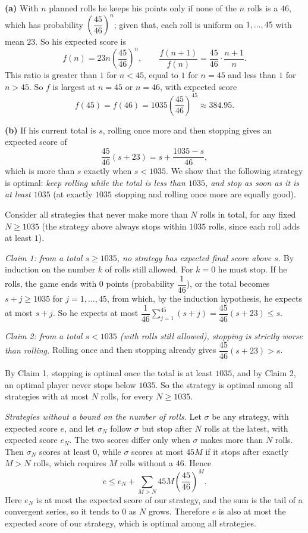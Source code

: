 \textbf{(a)} With $n$ planned rolls he keeps his points only if none of the $n$ rolls is a $46$, which has probability $\left(\dfrac{45}{46}\right)^n$; given that, each roll is uniform on $1,\dots,45$ with mean $23$. So his expected score is
\[f(n)=23n\left(\dfrac{45}{46}\right)^n,\qquad \dfrac{f(n+1)}{f(n)}=\dfrac{45}{46}\cdot\dfrac{n+1}{n}.\]
This ratio is greater than $1$ for $n<45$, equal to $1$ for $n=45$ and less than $1$ for $n>45$. So $f$ is largest at $\boxed{n=45\text{ or }n=46}$, with expected score
\[f(45)=f(46)=1035\left(\dfrac{45}{46}\right)^{45}\approx\boxed{384.95}.\]

\textbf{(b)} If his current total is $s$, rolling once more and then stopping gives an expected score of
\[\dfrac{45}{46}(s+23)=s+\dfrac{1035-s}{46},\]
which is more than $s$ exactly when $s<1035$. We show that the following strategy is optimal: \emph{keep rolling while the total is less than $1035$, and stop as soon as it is at least $1035$} (at exactly $1035$ stopping and rolling once more are equally good).

Consider all strategies that never make more than $N$ rolls in total, for any fixed $N\ge1035$ (the strategy above always stops within $1035$ rolls, since each roll adds at least $1$).

\emph{Claim 1: from a total $s\ge1035$, no strategy has expected final score above $s$.} By induction on the number $k$ of rolls still allowed. For $k=0$ he must stop. If he rolls, the game ends with $0$ points (probability $\dfrac1{46}$), or the total becomes $s+j\ge1035$ for $j=1,\dots,45$, from which, by the induction hypothesis, he expects at most $s+j$. So he expects at most $\dfrac1{46}\sum_{j=1}^{45}(s+j)=\dfrac{45}{46}(s+23)\le s$.

\emph{Claim 2: from a total $s<1035$ (with rolls still allowed), stopping is strictly worse than rolling.} Rolling once and then stopping already gives $\dfrac{45}{46}(s+23)>s$.

By Claim 1, stopping is optimal once the total is at least $1035$, and by Claim 2, an optimal player never stops below $1035$. So the strategy is optimal among all strategies with at most $N$ rolls, for every $N\ge1035$.

\emph{Strategies without a bound on the number of rolls.} Let $\sigma$ be any strategy, with expected score $e$, and let $\sigma_N$ follow $\sigma$ but stop after $N$ rolls at the latest, with expected score $e_N$. The two scores differ only when $\sigma$ makes more than $N$ rolls. Then $\sigma_N$ scores at least $0$, while $\sigma$ scores at most $45M$ if it stops after exactly $M>N$ rolls, which requires $M$ rolls without a $46$. Hence
\[e\le e_N+\sum_{M>N}45M\left(\dfrac{45}{46}\right)^M.\]
Here $e_N$ is at most the expected score of our strategy, and the sum is the tail of a convergent series, so it tends to $0$ as $N$ grows. Therefore $e$ is also at most the expected score of our strategy, which is optimal among all strategies.

